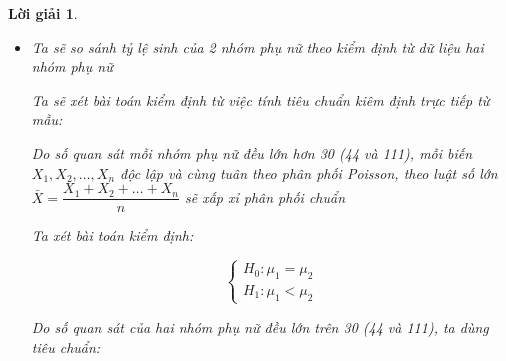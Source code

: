 \documentclass[14pt, a4paper]{article}
\theoremstyle{sltheorem}
\theoremstyle{soltheorem}
\newtheorem*{loigiai}{Lời giải}
\begin{document}
\begin{loigiai}
\begin{enumerate}
\begin{itemize}
        Ta có miền bác bỏ giả thiết $H_0$:
    
        \begin{equation*}
            B_{\beta}= \lbrace T: T < z_{\beta} \rbrace
        \end{equation*}
        với $\beta$ là mức ý nghĩa. Ta chọn mức ý nghĩa $\beta=0.05$, vậy $z_{0.05}\approx-1.6449$
    
        Ta tính $T=\dfrac{\dfrac{76}{46} - \dfrac{227}{113}}{\sqrt{\dfrac{76}{46^2} + \dfrac{227}{113^2}}}\approx-1.5393 \notin B_{0.05}$

        Như vậy ta chưa có cơ sở bác bỏ $H_0$, ta chấp nhận giả thiết $H_0$, ta có thể xem tỷ lệ sinh của hai nhóm phụ nữ là như nhau.

        Ta nhận thấy khi phân phối tiên nghiệm của tỷ lệ sinh là phân phối gamma, thì sự khác biệt tỷ lệ sinh giữa hai nhóm phụ thuộc vào rất nhiều $r$ và $\alpha$.
        Trong trường hợp này $\alpha=10$ lớn hơn khá nhiều so với $r=2$ làm cho tỷ lệ sinh trung bình của nhóm 1 tăng nhiều hơn tương đối so với nhóm 2 vì vậy làm giảm giá trị của tiêu chuẩn kiểm định.
        Nếu như giá trị $r$ và $\alpha$ nhỏ hơn chỉ khoảng từ 1 đến 3 thì sự khác biệt về tỷ lệ sinh trung bình của hai nhóm không thay đổi nhiều so với trường hợp phân phối tiên nghiệm của tỷ lệ sinh là phân phối đều.

        \item Ta sẽ so sánh tỷ lệ sinh của 2 nhóm phụ nữ theo kiểm định từ dữ liệu hai nhóm phụ nữ
        
        Ta sẽ xét bài toán kiểm định từ việc tính tiêu chuẩn kiêm định trực tiếp từ mẫu:

        Do số quan sát mỗi nhóm phụ nữ đều lớn hơn 30 (44 và 111), mỗi biến $X_1, X_2, \dots, X_n$ độc lập và cùng tuân theo phân phối Poisson,
        theo luật số lớn $\bar{X} = \dfrac{X_1 + X_2 + \dots + X_n}{n}$ sẽ xấp xỉ phân phối chuẩn

        Ta xét bài toán kiểm định:

        \begin{equation*}
            \begin{cases}
                H_0: \mu_1 = \mu_2 \\
                H_1: \mu_1 < \mu_2
            \end{cases}
        \end{equation*}

        Do số quan sát của hai nhóm phụ nữ đều lớn trên 30 (44 và 111), ta dùng tiêu chuẩn:


\end{itemize}
\end{enumerate}
\end{loigiai}
\end{document}
